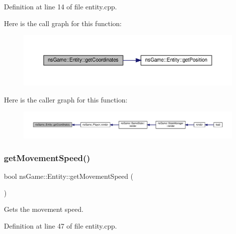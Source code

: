 Definition at line 14 of file entity.\+cpp.

Here is the call graph for this function\+:\nopagebreak
\begin{figure}[H]
\begin{center}
\leavevmode
\includegraphics[width=350pt]{classns_game_1_1_entity_a727ed96ea0a27b7232e701ed0ba6d3a4_cgraph}
\end{center}
\end{figure}
Here is the caller graph for this function\+:\nopagebreak
\begin{figure}[H]
\begin{center}
\leavevmode
\includegraphics[width=350pt]{classns_game_1_1_entity_a727ed96ea0a27b7232e701ed0ba6d3a4_icgraph}
\end{center}
\end{figure}
\mbox{\label{classns_game_1_1_entity_a03b934337b3c013abcccf3dfea6396d1}} 
\subsubsection{\texorpdfstring{get\+Movement\+Speed()}{getMovementSpeed()}}
{\footnotesize\ttfamily bool ns\+Game\+::\+Entity\+::get\+Movement\+Speed (\begin{DoxyParamCaption}{ }\end{DoxyParamCaption})\hspace{0.3cm}{\ttfamily [virtual]}}



Gets the movement speed. 



Definition at line 47 of file entity.\+cpp.

